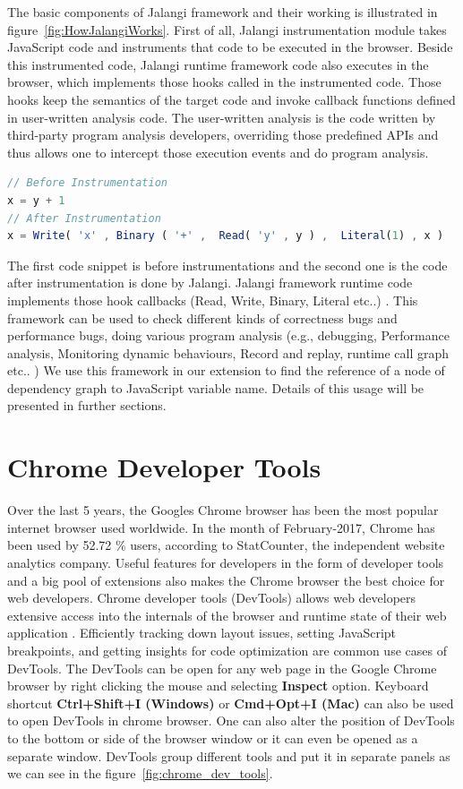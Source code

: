 The basic components of Jalangi framework and their working is illustrated in figure~\ref{fig:HowJalangiWorks}. First of all, Jalangi instrumentation module takes JavaScript code and instruments that code to be executed in the browser. Beside this instrumented code, Jalangi runtime framework code also executes in the browser, which implements those hooks called in the instrumented code. Those hooks keep the semantics of the target code and invoke callback functions defined in user-written analysis code. The user-written analysis is the code written by third-party program analysis developers, overriding those predefined APIs and thus allows one to intercept those execution events and do program analysis.

\begin{lstlisting}[language=JavaScript, caption=Jalangi Instrumentation]
// Before Instrumentation
x = y + 1
// After Instrumentation
x = Write( 'x' , Binary ( '+' ,  Read( 'y' , y ) ,	Literal(1) , x )
\end{lstlisting}

The first code snippet is before instrumentations and the second one is the code after instrumentation is done by Jalangi. Jalangi framework runtime code implements those hook callbacks (Read, Write, Binary, Literal etc..) .
This framework can be used to check different kinds of correctness bugs and performance bugs, doing various program analysis (e.g., debugging, Performance analysis, Monitoring dynamic behaviours, Record and replay, runtime call graph etc.. )
We use this framework in our extension to find the reference of a node of dependency graph to JavaScript variable name. Details of this usage will be presented in further sections.

\section{Chrome Developer Tools}
Over the last 5 years, the Google\textquotesingle s Chrome browser has been the most popular internet browser used worldwide. In the month of February-2017, Chrome has been used by 52.72  \% users, according to StatCounter, the independent website analytics company. Useful features for developers in the form of developer tools and a big pool of extensions also makes the Chrome browser the best choice for web developers.  Chrome developer tools (DevTools) allows web developers extensive access into the internals of the browser and runtime state of their web application \cite{CDT}. Efficiently tracking down layout issues, setting JavaScript breakpoints, and getting insights for code optimization are common use cases of DevTools.
The DevTools can be open for any web page in the Google Chrome browser by right clicking the mouse and selecting \textbf{Inspect} option. Keyboard shortcut \textbf{Ctrl+Shift+I (Windows)} or \textbf{Cmd+Opt+I (Mac)} can also be used to open DevTools in chrome browser.  One can also alter the position of DevTools to the bottom or side of the browser window or it can even be opened as a separate window. DevTools group different tools and put it in separate panels as we can see in the figure~\ref{fig:chrome_dev_tools}.

